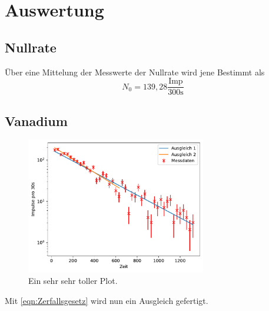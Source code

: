 \newpage
\section{Auswertung}
\subsection{Nullrate}
Über eine Mittelung der Messwerte der Nullrate wird jene Bestimmt als
\begin{equation}
    N_0 = 139,28 \frac{\text{Imp}}{300\text{s}}
\end{equation}
\subsection{Vanadium}
\begin{figure}
    \centering
    \includegraphics[width=0.7\textwidth]{plots/Vanadium.pdf}
    \caption{Ein sehr sehr toller Plot.}
\end{figure}
Mit \ref{eqn:Zerfallsgesetz} wird nun ein Ausgleich gefertigt.